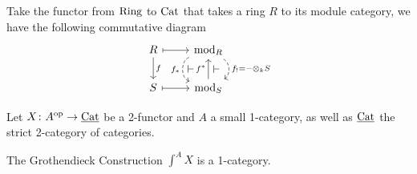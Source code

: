 \begin{exmp}
	Take the functor from $ \operatorname{Ring} $ to $ \operatorname{Cat} $ that takes a ring $ R $ to its module category, we have the following commutative diagram
	\[
	\begin{tikzcd}
		R 
		\ar[r, mapsto]
		\ar[d, "f"]
		&
		\Mod_R
		\ar[d, bend left=60, dashed, " f_! = - \otimes_k S "]
		\ar[d, bend right=70, dashed, " f_* "' ]
		\ar[d, bend left, phantom, " \vdash "]
		\ar[d, bend right=55, phantom, " \vdash "']
		\\ 
		S 
		\ar[r, mapsto]
		&
		\Mod_S
		\ar[u, " f^* "]
	\end{tikzcd}
	\]
\end{exmp}

Let $ X \colon A^{ \operatorname{op} } \to \underline{ \operatorname{Cat} } $ be a 2-functor and $ A $ a small 1-category, as well as $ \underline{ \operatorname{Cat} } $ the strict 2-category of categories.
 
\begin{prop}
	The Grothendieck Construction $ \int^A X $ is a 1-category.
\end{prop}

